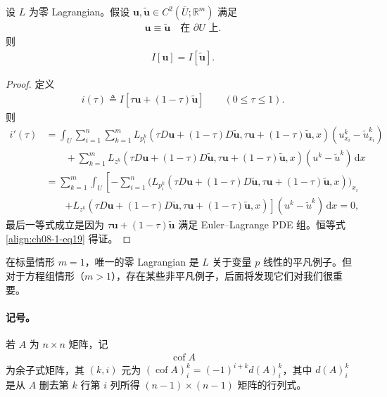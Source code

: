 \documentclass[../../main.tex]{subfiles}
\begin{document}
\begin{theorem}\label{theorem:ch08-1-1-零Lagrangian边界条件}
设 $L$ 为零 Lagrangian。假设 $\mathbf{u},\widetilde{\mathbf{u}}\in C^2(\overline{U};\mathbb{R}^m)$ 满足
\begin{align}
\mathbf{u}\equiv\widetilde{\mathbf{u}}\quad\text{在 }\partial U\text{ 上}.\label{align:ch08-1-eq18}
\end{align}
则
\begin{align}
I[\mathbf{u}]=I[\widetilde{\mathbf{u}}].\label{align:ch08-1-eq19}
\end{align}
\begin{proof}
定义
\begin{align*}
i(\tau)\triangleq I[\tau\mathbf{u}+(1-\tau)\widetilde{\mathbf{u}}]\qquad (0\leqslant\tau\leqslant 1).
\end{align*}
则
\begin{align*}
i'(\tau)&=\int_U\sum_{i=1}^n\sum_{k=1}^m L_{p_i^k}(\tau D\mathbf{u}+(1-\tau)D\widetilde{\mathbf{u}},\tau\mathbf{u}+(1-\tau)\widetilde{\mathbf{u}},x)(u_{x_i}^k-\widetilde{u}_{x_i}^k)\\
&\qquad+\sum_{k=1}^m L_{z^k}(\tau D\mathbf{u}+(1-\tau)D\widetilde{\mathbf{u}},\tau\mathbf{u}+(1-\tau)\widetilde{\mathbf{u}},x)(u^k-\widetilde{u}^k)\,\mathrm{d}x\\
&=\sum_{k=1}^m\int_U\left[-\sum_{i=1}^n\big(L_{p_i^k}(\tau D\mathbf{u}+(1-\tau)D\widetilde{\mathbf{u}},\tau\mathbf{u}+(1-\tau)\widetilde{\mathbf{u}},x)\big)_{x_i}\right.\\
&\qquad\left.+L_{z^k}(\tau D\mathbf{u}+(1-\tau)D\widetilde{\mathbf{u}},\tau\mathbf{u}+(1-\tau)\widetilde{\mathbf{u}},x)\right](u^k-\widetilde{u}^k)\,\mathrm{d}x=0,
\end{align*}
最后一等式成立是因为 $\tau\mathbf{u}+(1-\tau)\widetilde{\mathbf{u}}$ 满足 Euler--Lagrange PDE 组。恒等式\eqref{align:ch08-1-eq19} 得证。
\end{proof}
\end{theorem}

在标量情形 $m=1$，唯一的零 Lagrangian 是 $L$ 关于变量 $p$ 线性的平凡例子。但对于方程组情形（$m>1$），存在某些非平凡例子，后面将发现它们对我们很重要。

\paragraph{记号。}若 $A$ 为 $n\times n$ 矩阵，记
\begin{align*}
\operatorname{cof}A
\end{align*}
为余子式矩阵，其 $(k,i)$ 元为 $(\operatorname{cof}A)_i^k=(-1)^{i+k}d(A)_i^k$，其中 $d(A)_i^k$ 是从 $A$ 删去第 $k$ 行第 $i$ 列所得 $(n-1)\times(n-1)$ 矩阵的行列式。
\end{document}
